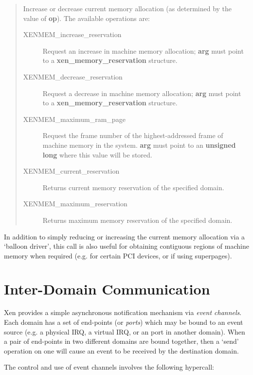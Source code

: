 \documentclass[11pt,twoside,final,openright,a4paper]{report}
\newcommand{\hypercall}[1]{\vspace{2mm}{\sf #1}}
\begin{document}
\begin{quote} 
\hypercall{memory\_op(unsigned int op, void *arg)}

Increase or decrease current memory allocation (as determined by 
the value of {\bf op}).  The available operations are:

\begin{description}
\item[XENMEM\_increase\_reservation] Request an increase in machine
  memory allocation; {\bf arg} must point to a {\bf
  xen\_memory\_reservation} structure.
\item[XENMEM\_decrease\_reservation] Request a decrease in machine
  memory allocation; {\bf arg} must point to a {\bf
  xen\_memory\_reservation} structure.
\item[XENMEM\_maximum\_ram\_page] Request the frame number of the
  highest-addressed frame of machine memory in the system.  {\bf arg}
  must point to an {\bf unsigned long} where this value will be
  stored.
\item[XENMEM\_current\_reservation] Returns current memory reservation
  of the specified domain.
\item[XENMEM\_maximum\_reservation] Returns maximum memory reservation
  of the specified domain.
\end{description}

\end{quote} 

In addition to simply reducing or increasing the current memory
allocation via a `balloon driver', this call is also useful for 
obtaining contiguous regions of machine memory when required (e.g. 
for certain PCI devices, or if using superpages).  


\section{Inter-Domain Communication}
\label{s:idc} 

Xen provides a simple asynchronous notification mechanism via
\emph{event channels}. Each domain has a set of end-points (or
\emph{ports}) which may be bound to an event source (e.g. a physical
IRQ, a virtual IRQ, or an port in another domain). When a pair of
end-points in two different domains are bound together, then a `send'
operation on one will cause an event to be received by the destination
domain.

The control and use of event channels involves the following hypercall: 
\end{document}
